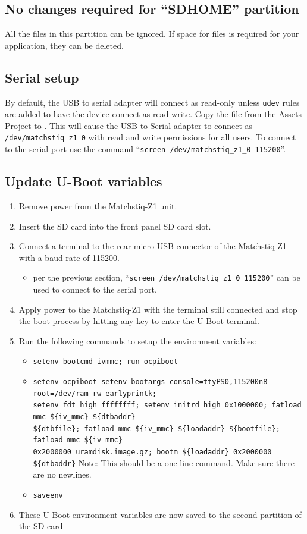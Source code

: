 \subsection*{No changes required for ``SDHOME'' partition}
All the files in this partition can be ignored. If space for files is required for your application, they can be deleted.
\subsection*{Serial setup}
By default, the USB to serial adapter will connect as read-only unless \texttt{udev} rules are added to have the device connect as read write.  Copy the file from the Assets Project  to .  This will cause the USB to Serial adapter to connect as \texttt{/dev/matchstiq\_z1\_0} with read and write permissions for all users.  To connect to the serial port use the command ``\texttt{screen /dev/matchstiq\_z1\_0 115200}''.
\subsection*{Update U-Boot variables}
\begin{enumerate}
\item Remove power from the Matchstiq-Z1 unit.
\item Insert the SD card into the front panel SD card slot.
\item Connect a terminal to the rear micro-USB connector of the Matchstiq-Z1 with a baud rate of 115200.
\begin{itemize}
\item per the previous section, ``\texttt{screen /dev/matchstiq\_z1\_0 115200}'' can be used to connect to the serial port.
\end{itemize}
\item Apply power to the Matchstiq-Z1 with the terminal still connected and stop the boot process by hitting any key to enter the U-Boot terminal.
\item Run the following commands to setup the environment variables:
\begin{itemize}
\item \texttt{setenv bootcmd \textquotesingle ivmmc; run ocpiboot\textquotesingle}
\item \texttt{setenv ocpiboot \textquotesingle setenv bootargs console=ttyPS0,115200n8 root=/dev/ram rw earlyprintk; \\
setenv fdt\_high ffffffff; setenv initrd\_high 0x1000000; fatload mmc \$\{iv\_mmc\} \$\{dtbaddr\}\\
\$\{dtbfile\}; fatload mmc \$\{iv\_mmc\} \$\{loadaddr\} \$\{bootfile\}; fatload mmc \$\{iv\_mmc\}\\
0x2000000 uramdisk.image.gz; bootm \$\{loadaddr\} 0x2000000 \$\{dtbaddr\}\textquotesingle}
\subitem *Note: This should be a one-line command. Make sure there are no newlines.
\item \texttt{saveenv}
\end{itemize}
\item These U-Boot environment variables are now saved to the second partition of the SD card
\end{enumerate}

